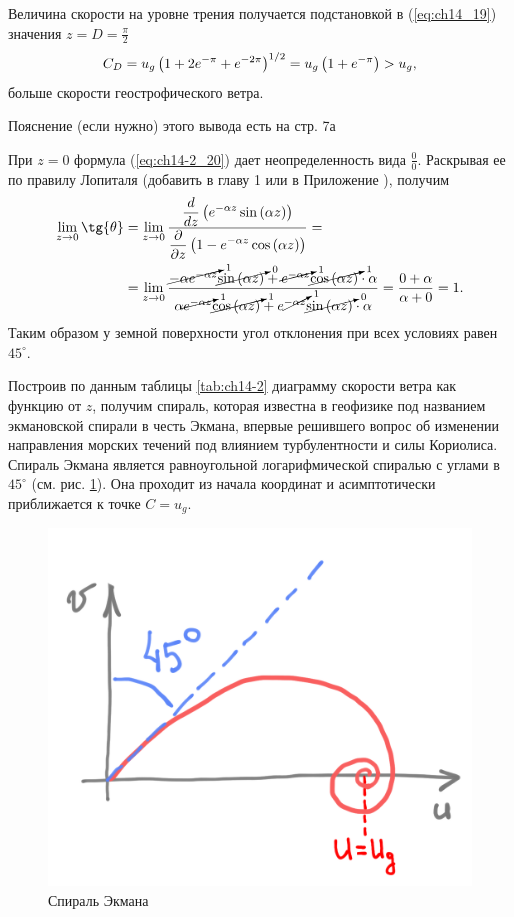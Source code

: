 Величина скорости на уровне трения получается подстановкой в (\ref{eq:ch14_19}) значения $z=D=\frac{\pi}{2}$
\begin{equation}
    \label{eq:ch14_22}
    C_D = u_g \displaystyle \left(  1 + 2e^{-\pi} + e^{-2\pi}  \right)^{1/2} = u_g \displaystyle \left(  1 + e^{-\pi}  \right) > u_g,
\end{equation}
больше скорости геострофического ветра.

\begin{warn}
    Пояснение (если нужно) этого вывода есть на стр. 7а  
\end{warn}

При $z=0$ формула (\ref{eq:ch14-2_20}) дает неопределенность вида $\frac{0}{0}$. Раскрывая ее по {\color{red}правилу Лопиталя (добавить в главу 1 или в Приложение )}, получим 
\begin{multline*}
  \begin{aligned}
    \lim_{z\rightarrow0}{ \tg{\theta} } &= 
    \lim_{z\rightarrow0} { \frac{ \td{}{z}\rb{ e^{-\alpha z} \sin{(\alpha z)} } }
        { \pd{}{z} \rb{ 1-e^{-\alpha z} \cos{(\alpha z)} } } } = \\
    &= \lim_{z\rightarrow0} {  
        \frac{ \cancelto{1}{-\alpha e^{-\alpha z}} \cancelto{0}{\sin{(\alpha z)}} + 
            \cancelto{1}{e^{-\alpha z}} \cancelto{1}{\cos{(\alpha z)}} \cdot \alpha }
        { \alpha \cancelto{1}{e^{-\alpha z}} \cancelto{1}{\cos{(\alpha z)}} + 
            e\cancelto{1}{^{-\alpha z}} \cancelto{0}{\sin{ (\alpha z) }} \cdot \alpha } } = 
    \frac{0+\alpha}{\alpha+0} = 1.
  \end{aligned}
\end{multline*}
Таким образом у земной поверхности угол отклонения при всех условиях равен $45^{\circ}$. 

Построив по данным таблицы \ref{tab:ch14-2} диаграмму скорости ветра как функцию от $z$, получим спираль, которая известна в геофизике под названием экмановской спирали в честь Экмана, впервые решившего вопрос об изменении направления морских течений под влиянием турбулентности и силы Кориолиса. Спираль Экмана является равноугольной логарифмической спиралью с углами в $45^{\circ}$ (см. рис. \ref{fig:ch14-2_ekman}). Она проходит из начала координат и асимптотически приближается к точке $C=u_g$.

    \begin{figure}[h]
        \centering
        \includegraphics[width=0.5\linewidth]{pics/ch14-2_ekman.png}
    \caption{\label{fig:ch14-2_ekman} {\color{red} Спираль Экмана }}
    \end{figure}

